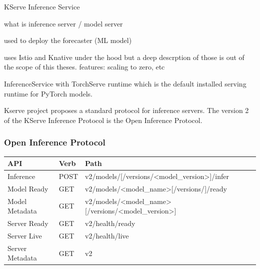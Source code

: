 KServe Inference Service


what is
inference server / model server


used to deploy the forecaster (ML model)


uses Istio and Knative under the hood
but a deep descrption of those is out of the scope of this theses.
features: scaling to zero, etc


InferenceService with TorchServe runtime which is the default installed serving runtime for PyTorch models.

Kserve project proposes a standard protocol for inference servers.
The version 2 of the KServe Inference Protocol is the Open Inference Protocol.



\subsubsection{Open Inference Protocol}


\begin{table}[h!]
\centering
\begin{tabular}{|l|l|l|}
\hline
\textbf{API}    & \textbf{Verb} & \textbf{Path}                                                                                         \\ \hline
Inference       & POST          & v2/models/{[}/versions/\textless{}model\_version\textgreater{}{]}/infer                               \\ \hline
Model Ready     & GET           & v2/models/\textless{}model\_name\textgreater{}{[}/versions/{]}/ready                                  \\ \hline
Model Metadata  & GET           & v2/models/\textless{}model\_name\textgreater{}{[}/versions/\textless{}model\_version\textgreater{}{]} \\ \hline
Server Ready    & GET           & v2/health/ready                                                                                       \\ \hline
Server Live     & GET           & v2/health/live                                                                                        \\ \hline
Server Metadata & GET           & v2                                                                                                    \\ \hline
\end{tabular}
\end{table}





